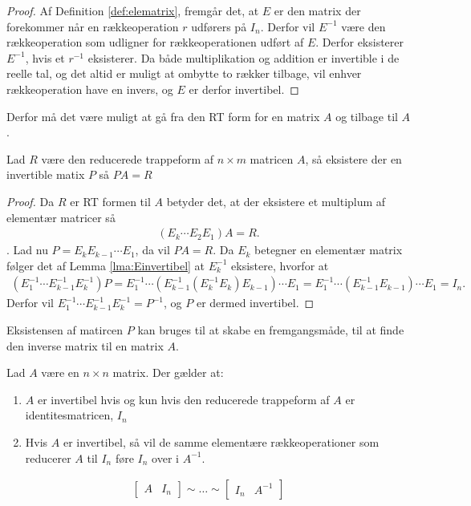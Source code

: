 \begin{proof}
Af Definition \ref{def:elematrix}, fremgår det, at $E$ er den matrix der forekommer når en rækkeoperation $r$ udførers på $I_n$. Derfor vil $E^{-1}$ være den rækkeoperation som udligner for rækkeoperationen udført af $E$.
Derfor eksisterer $E^{-1}$, hvis et $r^{-1}$ eksisterer. 
Da både multiplikation og addition er invertible i de reelle tal, og det altid er muligt at ombytte to rækker tilbage, vil enhver rækkeoperation have en invers, og $E$ er derfor invertibel.
\end{proof}
Derfor må det være muligt at gå fra den RT form for en matrix $A$ og tilbage til $A$.
\begin{lma}
Lad $R$ være den reducerede trappeform af $n\times m$ matricen $A$, så eksistere der en invertible matix $P$ så $PA = R$
\label{lma:PA=R}
\end{lma}
\begin{proof}
Da $R$ er RT formen til $A$ betyder det, at der eksistere et multiplum af elementær matricer så
\begin{align*}
\left( E_k \dotsm E_2 E_1 \right) A = R.
\end{align*}.
Lad nu $P = E_k E_{k-1} \dotsm E_1$, da vil $PA = R$.
Da $E_k$ betegner en elementær matrix følger det af Lemma \ref{lma:Einvertibel} at $E_k^{-1}$ eksistere, hvorfor at 
\begin{align*}
\left( E_1^{-1}\dotsm E_{k-1}^{-1} E_k^{-1} \right) P = E_1^{-1}\dotsm \left( E_{k-1}^{-1}\left( E_k^{-1}E_k \right) E_{k-1}\right)\dotsm E_1 = E_1^{-1}\dotsm \left( E_{k-1}^{-1}  E_{k-1} \right) \dotsm E_1 = I_n.
\end{align*}
Derfor vil $E_1^{-1}\dotsm E_{k-1}^{-1} E_k^{-1} = P^{-1}$, og $P$ er dermed invertibel.
\end{proof}
Eksistensen af matircen $P$ kan bruges til at skabe en fremgangsmåde, til at finde den inverse matrix til en matrix $A$.
\begin{stn}
Lad $A$ være en $n \times n$ matrix. Der gælder at: 
\begin{enumerate}[label=(\alph*)]
\item $A$ er invertibel hvis og kun hvis den reducerede trappeform af $A$ er identitesmatricen, $I_n$
\item Hvis $A$ er invertibel, så vil de samme elementære rækkeoperationer som reducerer $A$ til $I_n$ føre $I_n$ over i $A^{-1}$.  
\end{enumerate}
\begin{align*}
\begin{bmatrix}
A & I_n
\end{bmatrix} \sim \dots \sim
\begin{bmatrix}
I_n & A^{-1}
\end{bmatrix}
\end{align*}
\label{stn:inversmatrix}
\end{stn}
